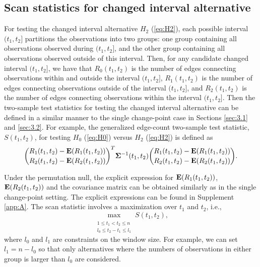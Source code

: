 \documentclass[arxiv, preprint]{imsart}
\numberwithin{equation}{section}
\theoremstyle{plain}
\begin{document}
\subsection{Scan statistics for changed interval alternative}
For testing the changed interval alternative $H_2$ (\ref{eq:H2}), each possible interval $(t_1,t_2]$ partitions the observations into two groups: one group containing all observations observed during $(t_1, t_2]$, and the other group containing all observations observed outside of this interval. Then, for any candidate changed interval $(t_1, t_2]$, we have that $R_0(t_1,t_2)$ is the number of edges connecting observations within and outside the interval $(t_1,t_2]$, $R_1(t_1,t_2)$ is the number of edges connecting observations outside of the interval $(t_1,t_2]$, and $R_2(t_1,t_2)$ is the number of edges connecting observations within the interval $(t_1,t_2]$.  Then the two-sample test statistics for testing the changed interval alternative can be defined in a similar manner to the single change-point case in Sections \ref{sec:3.1} and \ref{sec:3.2}. For example, the generalized edge-count two-sample test statistic, $S(t_1,t_2)$, for testing $H_0$ (\ref{eq:H0}) versus $H_2$ (\ref{eq:H2}) is defined as 
\begin{align*}
  \binom{R_1(t_1,t_2) - \mathbf{E}(R_1(t_1,t_2))}{R_2(t_1,t_2) - \mathbf{E}(R_2(t_1,t_2))}^T
\mathbf{\Sigma}^{-1}(t_1,t_2) \binom{R_1(t_1,t_2) - \mathbf{E}(R_1(t_1,t_2))}{R_2(t_1,t_2) - \mathbf{E}(R_2(t_1,t_2))}.
\end{align*}

Under the permutation null, the explicit expression for $\mathbf{E}(R_1(t_1,t_2))$, \\ $\mathbf{E}(R_2(t_1,t_2))$ and the covariance matrix can be obtained similarly as in the single change-point setting. The explicit expressions can be found in Supplement \ref{app:A}.  The scan statistic involves a maximization over $t_1$ and $t_2$, i.e., %
 \begin{equation} \max_{\substack{\\ 1 \le t_1 < t_2 \le n \\ l_0 \le t_2 - t_1 \le l_1}} S(t_1,t_2), \end{equation}
where $l_0$ and $l_1$ are constraints on the window size. For example, we can set $l_1 = n - l_0$ so that only alternatives where the numbers of observations in either group is larger than $l_0$ are considered. 
\end{document}
